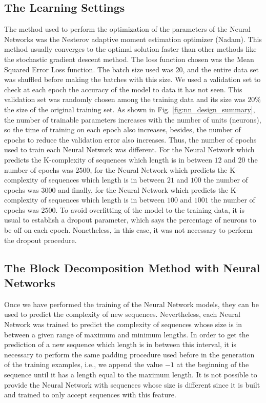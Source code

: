 \subsection{The Learning Settings}
The method used to perform the optimization of the parameters of the Neural Networks was the Nesterov adaptive moment estimation optimizer (Nadam). This method usually converges to the optimal solution faster than other methods like the stochastic gradient descent method. The loss function chosen was the Mean Squared Error Loss function. The batch size used was $20$, and the entire data set was shuffled before making the batches with this size. We used a validation set to check at each epoch the accuracy of the model to data it has not seen. This validation set was randomly chosen among the training data and its size was $20 \%$ the size of the original training set. As shown in Fig. \ref{fig:nn_design_summary}, the number of trainable parameters increases with the number of units (neurons), so the time of training on each epoch also increases, besides, the number of epochs to reduce the validation error also increases. Thus, the number of epochs used to train each Neural Network was different. For the Neural Network which predicts the K-complexity of sequences which length is in between $12$ and $20$ the number of epochs was $2500$, for the Neural Network which predicts the K-complexity of sequences which length is in between $21$ and $100$ the number of epochs was $3000$ and finally, for the Neural Network which predicts the K-complexity of sequences which length is in between $100$ and $1001$ the number of epochs was $2500$. To avoid overfitting of the model to the training data, it is usual to establish a dropout parameter, which says the percentage of neurons to be off on each epoch. Nonetheless, in this case, it was not necessary to perform the dropout procedure.


\subsection{The Block Decomposition Method with Neural Networks}
Once we have performed the training of the Neural Network models, they can be used to predict the complexity of new sequences. Nevertheless, each Neural Network was trained to predict the complexity of sequences whose size is in between a given range of maximum and minimum lengths. In order to get the prediction of a new sequence which length is in between this interval, it is necessary to perform the same padding procedure used before in the generation of the training examples, i.e., we append the value $-1$ at the beginning of the sequence until it has a length equal to the maximum length. It is not possible to provide the Neural Network with sequences whose size is different since it is built and trained to only accept sequences with this feature.\\

